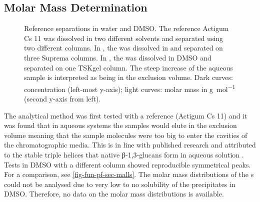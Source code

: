 \subsection{Molar Mass Determination}
\begin{figure}
	\begin{center}

	\caption[Reference \SCL{} Separations in Water and DMSO]{Reference \scl{} separations in water and DMSO. The reference \scl{} Actigum Cs 11 was dissolved in two different solvents and separated using two different columns. In , the \scl{} was dissolved in   and separated on three Suprema columns. In , the \scl{} was dissolved in DMSO and separated on one TSKgel column. The steep increase of the aqueous sample is interpreted as being in the exclusion volume. Dark curves: concentration (left-most y-axis); light curves: molar mass in \si{\gram\per\mol} (second y-axis from left).\label{fig-fun-pf-sec-malls}}
	\end{center}
\end{figure}
The analytical method was first tested with a reference \scl{} (Actigum Cs 11) and it was found that in aqueous systems the samples would elute in the exclusion volume meaning that the sample molecules were too big to enter the cavities of the chromatographic media. This is in line with published research and attributed to the stable triple helices that native β-1,3-glucans form in aqueous solution \cite{Yanaki1981, Bluhm1982, Yanaki1983a, Sato1983, Farina2001, PatentUS_20040265977}. Tests in DMSO with a different column showed reproducible symmetrical peaks. For a comparison, see \vref{fig-fun-pf-sec-malls}. The molar mass distributions of the \eps{}s could not be analysed due to very low to no solubility of the precipitates in DMSO. Therefore, no data on the molar mass distributions is available.

